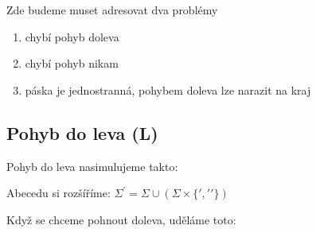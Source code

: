 \documentclass{article}
\begin{document}
Zde budeme muset adresovat dva problémy

\begin{enumerate}
    \item chybí pohyb doleva
    \item chybí pohyb nikam
    \item páska je jednostranná,   
          pohybem doleva lze narazit na kraj
\end{enumerate}

\subsection{Pohyb do leva (L)}

Pohyb do leva nasimulujeme takto:

Abecedu si rozšíříme: $\Sigma^\prime = \Sigma \cup (\Sigma \times \{ \prime, \prime\prime \} )$

Když se chceme pohnout doleva, uděláme toto:
\end{document}
